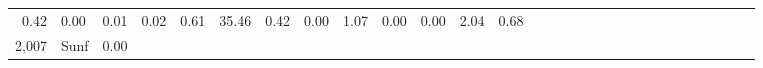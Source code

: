 \documentclass[]{article}
\begin{document}
\begin{longtable}[]{@{}rlrrrrrrrrrrrrrrrrrrrrrrrrrrr@{}}
\begin{minipage}[t]{0.01\columnwidth}
0.42\strut
\end{minipage} & \begin{minipage}[t]{0.01\columnwidth}\raggedleft\strut
0.00\strut
\end{minipage} & \begin{minipage}[t]{0.01\columnwidth}\raggedleft\strut
0.01\strut
\end{minipage} & \begin{minipage}[t]{0.02\columnwidth}\raggedleft\strut
0.02\strut
\end{minipage} & \begin{minipage}[t]{0.02\columnwidth}\raggedleft\strut
0.61\strut
\end{minipage} & \begin{minipage}[t]{0.01\columnwidth}\raggedleft\strut
35.46\strut
\end{minipage} & \begin{minipage}[t]{0.01\columnwidth}\raggedleft\strut
0.42\strut
\end{minipage} & \begin{minipage}[t]{0.01\columnwidth}\raggedleft\strut
0.00\strut
\end{minipage} & \begin{minipage}[t]{0.02\columnwidth}\raggedleft\strut
1.07\strut
\end{minipage} & \begin{minipage}[t]{0.01\columnwidth}\raggedleft\strut
0.00\strut
\end{minipage} & \begin{minipage}[t]{0.01\columnwidth}\raggedleft\strut
0.00\strut
\end{minipage} & \begin{minipage}[t]{0.01\columnwidth}\raggedleft\strut
2.04\strut
\end{minipage} & \begin{minipage}[t]{0.01\columnwidth}\raggedleft\strut
0.68\strut
\end{minipage}\tabularnewline
\begin{minipage}[t]{0.01\columnwidth}\raggedleft\strut
2,007\strut
\end{minipage} & \begin{minipage}[t]{0.02\columnwidth}\raggedright\strut
Sunf\strut
\end{minipage} & \begin{minipage}[t]{0.01\columnwidth}\raggedleft\strut
0.00\strut
\end{minipage} & \begin{minipage}[t]{0.02\columnwidth}\raggedleft\strut

\end{minipage}
\end{longtable}
\end{document}
